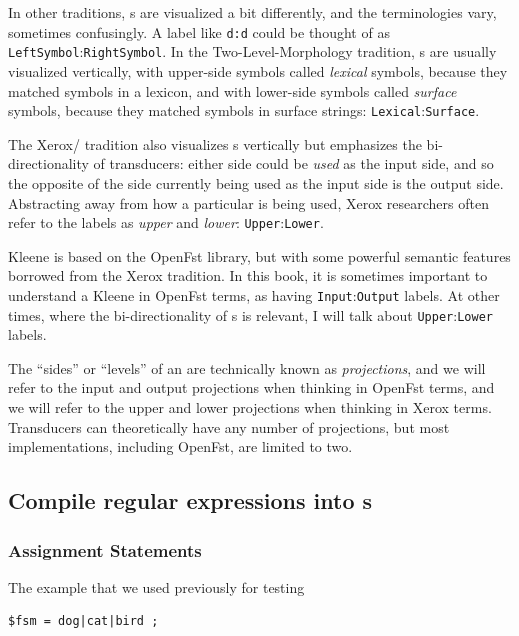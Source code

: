 In other traditions, s are visualized a bit differently, and
the terminologies
vary, sometimes confusingly.  A label like \texttt{d:d} could be thought of as
\texttt{LeftSymbol}:\texttt{RightSymbol}.  In the Two-Level-Morphology tradition,
\fsm{}s are usually  visualized vertically, with upper-side symbols
called \emph{lexical} symbols, because they matched symbols in a lexicon, and
with lower-side symbols called \emph{surface} symbols, because they matched
symbols in surface strings: \texttt{Lexical}:\texttt{Surface}.  

The Xerox/ tradition also visualizes \fsm{}s vertically but
emphasizes the bi-directionality of
transducers: either side could be \emph{used} as the input side, and so the opposite
of the side currently being used as the input side is the output side.  
Abstracting away from how a
particular \fsm{} is being used, Xerox researchers often refer to
the labels as \emph{upper} and \emph{lower}:  \texttt{Upper}:\texttt{Lower}.  

Kleene is based on the OpenFst library, but with some powerful semantic features
borrowed from
the Xerox tradition.  In this book, it is sometimes important to
understand a Kleene \fsm{} in OpenFst terms, as having \texttt{Input}:\texttt{Output}
labels.  At other times, where the bi-directionality of \fsm{}s is
relevant, I will talk about \texttt{Upper}:\texttt{Lower} labels. 

The ``sides'' or ``levels'' of an \fsm{} are technically known as
\emph{projections}, and we will refer to the input and output projections when
thinking in OpenFst terms, and we will refer to the upper and lower projections
when thinking in Xerox terms.  Transducers can theoretically have any number of
projections, but most implementations, including OpenFst, are limited to two.

\subsection{Compile regular expressions into \fsm{}s}

\subsubsection{Assignment Statements}

The example that we used previously for testing

\begin{Verbatim}
$fsm = dog|cat|bird ;
\end{Verbatim}

